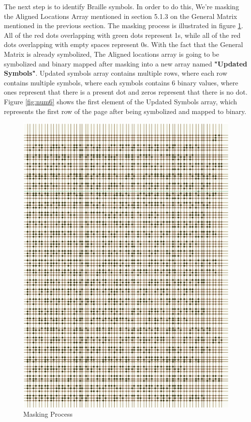 The next step is to identify Braille symbols. In order to do this, We're masking the Aligned Locations Array mentioned in section 5.1.3 on the General Matrix mentioned in the previous section. The masking process is illustrated in figure \ref{fig:num8}.  All of the red dots overlapping with green dots represent 1s, while all of the red dots overlapping with empty spaces represent 0s. With the fact that the General Matrix is already symbolized, The Aligned locations array is going to be symbolized and binary mapped after masking into a new array named \textbf{"Updated Symbols"}. Updated symbols array contains multiple rows, where each row contains multiple symbols, where each symbols contains 6 binary values, where ones represent that there is a present dot and zeros represent that there is no dot. Figure \ref{fig:num6} shows the first element of the Updated Symbols array, which represents the first row of the page after being symbolized and mapped to binary.

\begin{figure}[H]
    \begin{adjustwidth}{-1.5cm}{}
      \centering
      \includegraphics[width=1.12\linewidth]{Hough/mask.jpg}
    \end{adjustwidth}
    \caption{Masking Process}
    \label{fig:num8}
\end{figure}

